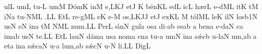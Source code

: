 \sgn {}ul\punctum L\egn
\sgn {}um\punctum L\egn
\spatium
\sgn tu-\punctum L\egn
\sgn {}um\punctum M\egn
\spatium
\sgn D{\'o}m\punctum K\egn
\sgn {}in\punctum M\egn
\sgn {}e,\climacus LKJ\egn
\spatium
\divisiominor
\spatium
\sgn {}et\punctum J\egn
\spatium
\custos K
\lineaproxima
\sgn b{\'e}n\pes KL\egn
\sgn {}ed\punctum L\egn
\sgn {}ic\punctum L\egn
\spatium
\sgn h{\ae}r\punctum L\egn
\sgn {}e{-d}\clivis ML\egn
\sgn {}it\punctum K\egn
{}t\punctum M\egn
\sgn {}i{}\pes Na\egn
\spatium
\sgn tu-\climacus NML\egn
\sgn {}{\ae}.\punctum L\augmentum L\egn
\spatium
\divisiofinalis
\spatium
\sgn {}Et\punctum L\egn
\spatium
\sgn re{-g}\clivis ML\egn
\sgn {}e{}\punctum K\egn
\spatium
\sgn {}e-\punctum M\egn
\sgn {}o{s,}\climacus LKJ\augmentum J\egn
\spatium
\divisiominor
\spatium
\sgn {}et\punctum J\egn
\spatium
\sgn {}ex\pes KL\egn
\custos M
\lineaproxima
\sgn t{\'o}l\cephalicus ML\egn
\sgn le{}\punctum K\egn
\spatium
\sgn {}il\punctum N\egn
\sgn los\episem b1\punctum N\egn
\spatium
\divisiominima
\spatium
\sgn {}us\punctum N\egn
{}e{}\punctum N\egn
\spatium
\sgn {}in\punctum a\egn
\spatium
\sgn {}{\ae}t\punctum M\egn
{}\climacus NML\egn
\sgn nu{m.}\punctum L\augmentum L\egn
\spatium
\divisiofinalis
\spatium
\sgn Per\punctum L\egn
\spatium
\sgn s{\'\i}n\punctum N\egn
\sgn gul\punctum a\egn
\sgn {}os\punctum a\egn
\spatium
\sgn di-\pes ab\egn
\sgn {}es\punctum a\augmentum b\egn
\spatium
\divisiominor
\spatium
\custos a
\lineaproxima
\sgn ben\punctum a\egn
\sgn {}e{-d}\clivis aN\egn
\sgn {}{\'\i}c\punctum a\egn
\sgn {}im\pes ab\egn
\sgn {}us\bivirga N\egn
\spatium
\sgn te.\punctum L\augmentum L\egn
\spatium
\divisiofinalis
\spatium
\sgn {}Et\punctum L\egn
\spatium
\sgn lau\punctum N\egn
\sgn d{\'a}m\punctum a\egn
\sgn {}us\punctum a\egn
\spatium
\sgn nom\punctum a\egn
\sgn {}en\punctum a\egn
\spatium
\sgn tu-\punctum a\egn
\sgn {}um\punctum N\egn
\spatium
\sgn {}in\punctum a\egn
\spatium
\sgn s{\'\ae}c\punctum b\egn
\sgn {}u{-l}\clivis aN\egn
\sgn {}u{m,}\punctum a\augmentum b\egn
\spatium
\divisiominor
\spatium
\custos a
\lineaproxima
\sgn {}et\punctum a\egn
\spatium
\sgn {}in\punctum a\egn
\spatium
\sgn s{\'\ae}c\clivis aN\egn
\sgn {}u-\punctum a\egn
\sgn lu{m,}\pes ab\egn
\spatium
\sgn s{\'\ae}c\punctum N\egn
\sgn {}u-\punctum N\egn
\sgn li.\punctum L\augmentum L\egn
\spatium
\divisiofinalis
\spatium
\sgn Dig\punctum L\egn
